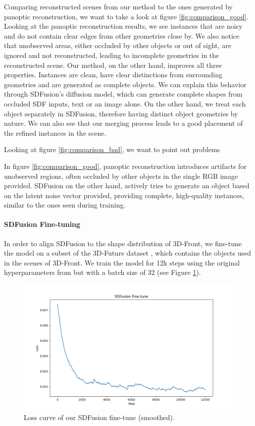 Comparing reconstructed scenes from our method to the ones generated by panoptic reconstruction, we want to take a look at figure \ref{fig:comparison_good}. Looking at the panoptic reconstruction results, we see instances that are noisy and do not contain clear edges from other geometries close by. We also notice that unobserved areas, either occluded by other objects or out of sight, are ignored and not reconstructed, leading to incomplete geometries in the reconstructed scene. Our method, on the other hand, improves all three properties. Instances are clean, have clear distinctions from surrounding geometries and are generated as complete objects. We can explain this behavior through SDFusion's diffusion model, which can generate complete shapes from occluded SDF inputs, text or an image alone. On the other hand, we treat each object separately in SDFusion, therefore having distinct object geometries by nature.
We can also see that our merging process leads to a good placement of the refined instances in the scene. 

Looking at figure \ref{fig:comparison_bad}, we want to point out problems 

In figure \ref{fig:comparison_good}, panoptic reconstruction introduces artifacts for unobserved regions, often occluded by other objects in the single RGB image provided. SDFusion on the other hand, actively tries to generate an object based on the latent noise vector provided, providing complete, high-quality instances, similar to the ones seen during training. 

\paragraph{SDFusion Fine-tuning}
In order to align SDFusion to the shape distribution of 3D-Front, we fine-tune the model on a subset of the 3D-Future dataset \citep{fu20213e}, which contains the objects used in the scenes of 3D-Front.
We train the model for 12k steps using the original hyperparameters from \citet{cheng2023sdfusion} but with a batch size of 32 (see Figure \ref{fig:finetune}).

\begin{figure}
  \centering
  \includegraphics[width=\linewidth]{figs/sdfusion_finetune_loss_plot.png}
  \caption{Loss curve of our SDFusion fine-tune (smoothed).}
  \label{fig:finetune}
\end{figure}

